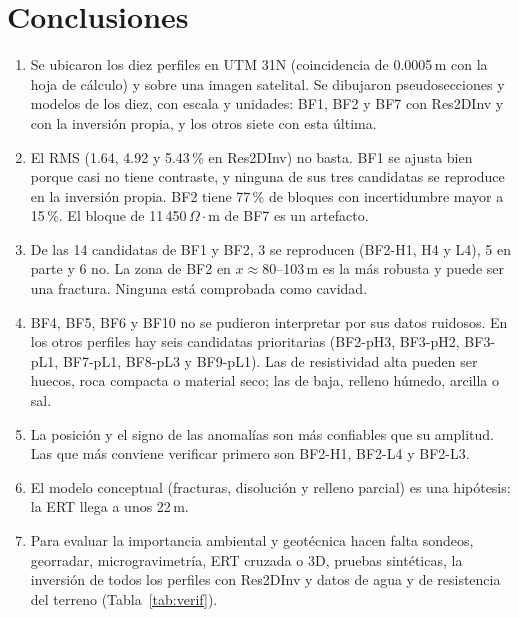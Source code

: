 \documentclass[conference]{IEEEtran}
\newcommand{\ohmm}{\ensuremath{\Omega\!\cdot\!\mathrm{m}}}
\begin{document}
\section{Conclusiones}
\begin{enumerate}
\item Se ubicaron los diez perfiles en UTM 31N (coincidencia de 0.0005\,m con la hoja de c\'alculo) y sobre una imagen satelital. Se dibujaron pseudosecciones y modelos de los diez, con escala y unidades: BF1, BF2 y BF7 con Res2DInv y con la inversi\'on propia, y los otros siete con esta \'ultima.
\item El RMS (1.64, 4.92 y 5.43\,\% en Res2DInv) no basta. BF1 se ajusta bien porque casi no tiene contraste, y ninguna de sus tres candidatas se reproduce en la inversi\'on propia. BF2 tiene 77\,\% de bloques con incertidumbre mayor a 15\,\%. El bloque de 11\,450\,\ohmm{} de BF7 es un artefacto.
\item De las 14 candidatas de BF1 y BF2, 3 se reproducen (BF2-H1, H4 y L4), 5 en parte y 6 no. La zona de BF2 en $x\approx 80$--103\,m es la m\'as robusta y puede ser una fractura. Ninguna est\'a comprobada como cavidad.
\item BF4, BF5, BF6 y BF10 no se pudieron interpretar por sus datos ruidosos. En los otros perfiles hay seis candidatas prioritarias (BF2-pH3, BF3-pH2, BF3-pL1, BF7-pL1, BF8-pL3 y BF9-pL1). Las de resistividad alta pueden ser huecos, roca compacta o material seco; las de baja, relleno h\'umedo, arcilla o sal.
\item La posici\'on y el signo de las anomal\'ias son m\'as confiables que su amplitud. Las que m\'as conviene verificar primero son BF2-H1, BF2-L4 y BF2-L3.
\item El modelo conceptual (fracturas, disoluci\'on y relleno parcial) es una hip\'otesis: la ERT llega a unos 22\,m.
\item Para evaluar la importancia ambiental y geot\'ecnica hacen falta sondeos, georradar, microgravimetr\'ia, ERT cruzada o 3D, pruebas sint\'eticas, la inversi\'on de todos los perfiles con Res2DInv y datos de agua y de resistencia del terreno (Tabla~\ref{tab:verif}).
\end{enumerate}
\end{document}

